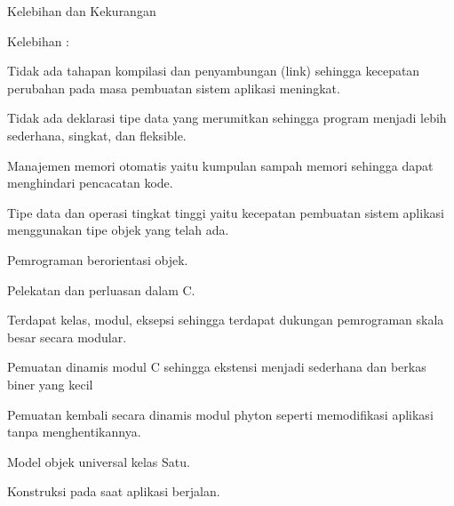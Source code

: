 \noindent 
{\fontsize{14pt}{14pt}\selectfont Kelebihan dan Kekurangan \\} \par
\noindent 
{\fontsize{14pt}{14pt}\selectfont Kelebihan : \\} \par
\noindent 
{\fontsize{14pt}{14pt}\selectfont Tidak ada tahapan kompilasi dan penyambungan (link) sehingga kecepatan perubahan pada masa pembuatan sistem aplikasi meningkat. \\} \par
\noindent 
{\fontsize{14pt}{14pt}\selectfont Tidak ada deklarasi tipe data yang merumitkan sehingga program menjadi lebih sederhana, singkat, dan fleksible. \\} \par
\noindent 
{\fontsize{14pt}{14pt}\selectfont Manajemen memori otomatis yaitu kumpulan sampah memori sehingga dapat menghindari pencacatan kode. \\} \par
\noindent 
{\fontsize{14pt}{14pt}\selectfont Tipe data dan operasi tingkat tinggi yaitu kecepatan pembuatan sistem aplikasi menggunakan tipe objek yang telah ada. \\} \par
\noindent 
{\fontsize{14pt}{14pt}\selectfont Pemrograman berorientasi objek. \\} \par
\noindent 
{\fontsize{14pt}{14pt}\selectfont Pelekatan dan perluasan dalam C. \\} \par
\noindent 
{\fontsize{14pt}{14pt}\selectfont Terdapat kelas, modul, eksepsi sehingga terdapat dukungan pemrograman skala besar secara modular. \\} \par
\noindent 
{\fontsize{14pt}{14pt}\selectfont Pemuatan dinamis modul C sehingga ekstensi menjadi sederhana dan berkas biner yang kecil \\} \par
\noindent 
{\fontsize{14pt}{14pt}\selectfont Pemuatan kembali secara dinamis modul phyton seperti memodifikasi aplikasi tanpa menghentikannya. \\} \par
\noindent 
{\fontsize{14pt}{14pt}\selectfont Model objek universal kelas Satu. \\} \par
\noindent 
{\fontsize{14pt}{14pt}\selectfont Konstruksi pada saat aplikasi berjalan. \\} \par
